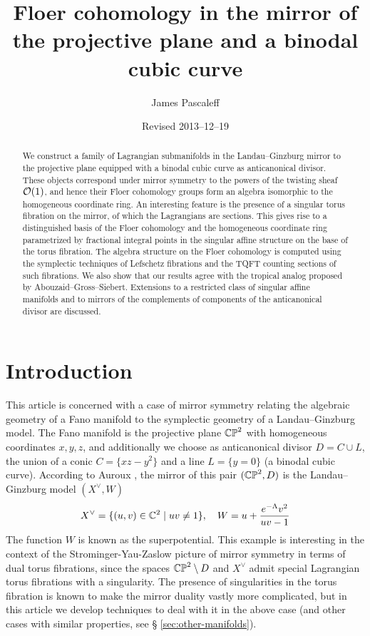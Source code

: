 \documentclass[12pt]{amsart}
\title[Mirror of the projective plane]{Floer cohomology in the mirror of the projective plane and a binodal cubic curve}
\author{James Pascaleff}
\date{Revised 2013--12--19}
\begin{document}
\begin{abstract}
  We construct a family of Lagrangian submanifolds in the
  Landau--Ginzburg mirror to the projective plane equipped with a
  binodal cubic curve as anticanonical divisor. These objects
  correspond under mirror symmetry to the powers of the twisting sheaf
  $\mathcal{O}(1)$, and hence their Floer cohomology groups form an algebra
  isomorphic to the homogeneous coordinate ring. An interesting
  feature is the presence of a singular torus fibration on the mirror,
  of which the Lagrangians are sections. This gives rise to a
  distinguished basis of the Floer cohomology and the homogeneous
  coordinate ring parametrized by fractional integral points in the
  singular affine structure on the base of the torus fibration. The
  algebra structure on the Floer cohomology is computed using the
  symplectic techniques of Lefschetz fibrations and the TQFT counting
  sections of such fibrations. We also show that our results agree
  with the tropical analog proposed by
  Abouzaid--Gross--Siebert. Extensions to a restricted class of
  singular affine manifolds and to mirrors of the complements of
  components of the anticanonical divisor are discussed.
\end{abstract}

\maketitle
\tableofcontents

\section{Introduction}
\label{sec:intro}


This article is concerned with a case of mirror symmetry relating the
algebraic geometry of a Fano manifold to the symplectic geometry of a
Landau--Ginzburg model. The Fano manifold is the projective plane
$\mathbb{CP}^2$ with homogeneous coordinates $x, y, z$, and additionally we choose as anticanonical divisor $D = C
\cup L$, the union of a conic $C = \{xz-y^2\}$ and a line $L = \{y=0\}$ (a binodal cubic
curve). According to Auroux \cite{auroux07}, the mirror of this pair
$(\mathbb{CP}^2,D)$ is the Landau--Ginzburg model $(X^\vee,W)$
\begin{equation}
  \begin{split}
    X^\vee = \{(u,v) \in \mathbb{C}^2 \mid uv \neq 1\}, \quad
    W = u + \frac{e^{-\Lambda}v^2}{uv-1}
  \end{split}
\end{equation}
The function $W$ is known as the superpotential. This example is
interesting in the context of the Strominger-Yau-Zaslow picture of
mirror symmetry \cite{syz} in terms of dual torus fibrations, since
the spaces $\mathbb{CP}^2\setminus D$ and $X^\vee$ admit special Lagrangian
torus fibrations with a singularity. The presence of singularities in
the torus fibration is known to make the mirror duality vastly more
complicated, but in this article we develop techniques to deal with it
in the above case (and other cases with similar properties, see \S
\ref{sec:other-manifolds}).
\end{document}
